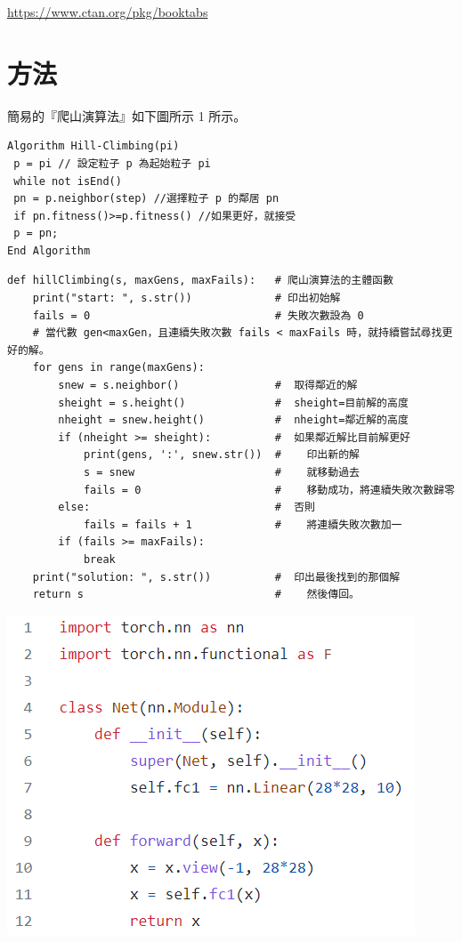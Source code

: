 \documentclass{article}
\begin{document}
\begin{center}
  \url{https://www.ctan.org/pkg/booktabs}
\end{center}


\section{方法}

簡易的『爬山演算法』如下圖所示
1 所示。

\begin{verbatim}
Algorithm Hill-Climbing(pi)
 p = pi // 設定粒子 p 為起始粒子 pi
 while not isEnd()
 pn = p.neighbor(step) //選擇粒子 p 的鄰居 pn
 if pn.fitness()>=p.fitness() //如果更好，就接受
 p = pn;
End Algorithm
\end{verbatim}

\begin{lstlisting}
def hillClimbing(s, maxGens, maxFails):   # 爬山演算法的主體函數
    print("start: ", s.str())             # 印出初始解
    fails = 0                             # 失敗次數設為 0
    # 當代數 gen<maxGen，且連續失敗次數 fails < maxFails 時，就持續嘗試尋找更好的解。
    for gens in range(maxGens):
        snew = s.neighbor()               #  取得鄰近的解
        sheight = s.height()              #  sheight=目前解的高度
        nheight = snew.height()           #  nheight=鄰近解的高度
        if (nheight >= sheight):          #  如果鄰近解比目前解更好
            print(gens, ':', snew.str())  #    印出新的解
            s = snew                      #    就移動過去
            fails = 0                     #    移動成功，將連續失敗次數歸零
        else:                             #  否則
            fails = fails + 1             #    將連續失敗次數加一
        if (fails >= maxFails):
            break
    print("solution: ", s.str())          #  印出最後找到的那個解
    return s                              #    然後傳回。
\end{lstlisting}

\begin{center}
\includegraphics{./img/fc1.png}
\end{center}
\end{document}

